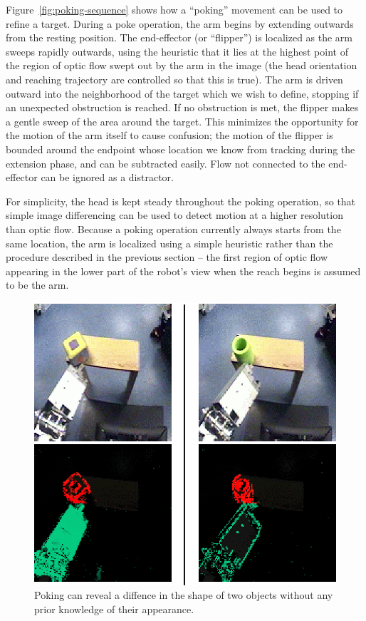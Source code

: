 Figure~\ref{fig:poking-sequence} shows how a ``poking'' movement can
be used to refine a target.  During a poke operation, the arm begins
by extending outwards from the resting position.  The end-effector (or
``flipper'') is localized as the arm sweeps rapidly outwards, using
the heuristic that it lies at the highest point of the region of optic
flow swept out by the arm in the image (the head orientation and
reaching trajectory are controlled so that this is true).  The arm is
driven outward into the neighborhood of the target which we wish to
define, stopping if an unexpected obstruction is reached.  If no
obstruction is met, the flipper makes a gentle sweep of the area
around the target.  This minimizes the opportunity for the motion of
the arm itself to cause confusion; the motion of the flipper is
bounded around the endpoint whose location we know from tracking
during the extension phase, and can be subtracted easily.  Flow not
connected to the end-effector can be ignored as a distractor.  

For simplicity, the head is kept steady throughout the poking
operation, so that simple image differencing can be used to detect
motion at a higher resolution than optic flow.  Because a poking
operation currently always starts from the same location, the arm
is localized using a simple heuristic rather than the procedure described
in the previous section -- the first region of optic flow appearing
in the lower part of the robot's view when the reach begins
is assumed to be the arm.

\ifverbose
\begin{figure}[tbh]
\begin{center}
\includegraphics[width=\columnwidth]{cube-and-cylinder.eps}
\caption{ 
\label{fig:cube-and-cylinder}
%
  Poking can reveal a diffence in the shape of two objects without
  any prior knowledge of their appearance.
%
}
\end{center}
\end{figure}
\fi

